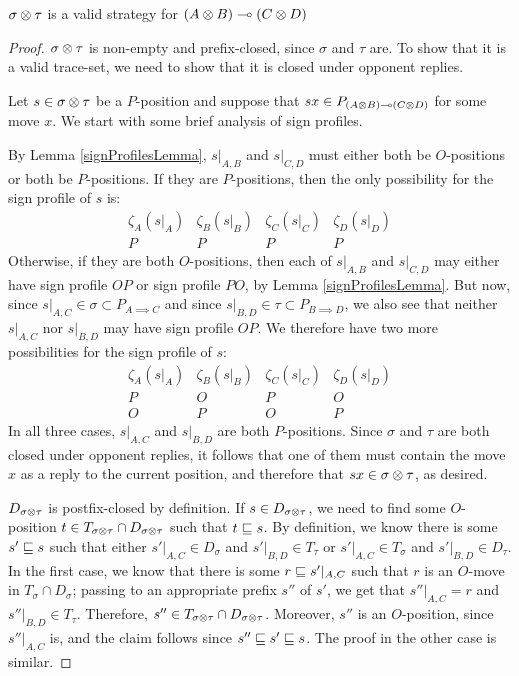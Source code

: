 \documentclass{article}
\begin{document}
\begin{proposition}
  $\sigma\otimes\tau$ is a valid strategy for $(A\otimes B)\multimap (C\otimes D)$
  \begin{proof}
    $\sigma\otimes\tau$ is non-empty and prefix-closed, since $\sigma$ and $\tau$ are.  To show that it is a valid trace-set, we need to show that it is closed under opponent replies.

    Let $s\in\sigma\otimes\tau$ be a $P$-position and suppose that $sx\in P_{(A\otimes B)\multimap (C\otimes D)}$ for some move $x$.  We start with some brief analysis of sign profiles.  

    By Lemma \ref{signProfilesLemma}, $s\vert_{A,B}$ and $s\vert_{C,D}$ must either both be $O$-positions or both be $P$-positions.  If they are $P$-positions, then the only possibility for the sign profile of $s$ is:
    \[
      \begin{array}{cccc}
        \zeta_A(s\vert_A) & \zeta_B(s\vert_B) & \zeta_C(s\vert_C) & \zeta_D(s\vert_D) \\
        \hline
        P & P & P & P
      \end{array}
      \]
    Otherwise, if they are both $O$-positions, then each of $s\vert_{A,B}$ and $s\vert_{C,D}$ may either have sign profile $OP$ or sign profile $PO$, by Lemma \ref{signProfilesLemma}.  But now, since $s\vert_{A,C}\in\sigma\subset P_{A\implies C}$ and since $s\vert_{B,D}\in\tau\subset P_{B\implies D}$, we also see that neither $s\vert_{A,C}$ nor $s\vert_{B,D}$ may have sign profile $OP$.  We therefore have two more possibilities for the sign profile of $s$:
    \[
      \begin{array}{cccc}
        \zeta_A(s\vert_A) & \zeta_B(s\vert_B) & \zeta_C(s\vert_C) & \zeta_D(s\vert_D) \\
        \hline
        P & O & P & O \\
        O & P & O & P
      \end{array}
      \]
    In all three cases, $s\vert_{A,C}$ and $s\vert_{B,D}$ are both $P$-positions.  Since $\sigma$ and $\tau$ are both closed under opponent replies, it follows that one of them must contain the move $x$ as a reply to the current position, and therefore that $sx\in\sigma\otimes\tau$, as desired.

    $D_{\sigma\otimes\tau}$ is postfix-closed by definition.  If $s\in D_{\sigma\otimes\tau}$, we need to find some $O$-position $t\in T_{\sigma\otimes\tau}\cap D_{\sigma\otimes\tau}$ such that $t\sqsubseteq s$.  By definition, we know there is some $s'\sqsubseteq s$ such that either $s'\vert_{A,C}\in D_\sigma$ and $s'\vert_{B,D}\in T_\tau$ or $s'\vert_{A,C}\in T_\sigma$ and $s'\vert_{B,D}\in D_\tau$.  In the first case, we know that there is some $r\sqsubseteq s'\vert_{A,C}$ such that $r$ is an $O$-move in $T_\sigma\cap D_\sigma$; passing to an appropriate prefix $s''$ of $s'$, we get that $s''\vert_{A,C}=r$ and $s''\vert_{B,D}\in T_\tau$.  Therefore, $s''\in T_{\sigma\otimes\tau}\cap D_{\sigma\otimes\tau}$.  Moreover, $s''$ is an $O$-position, since $s''\vert_{A,C}$ is, and the claim follows since $s''\sqsubseteq s'\sqsubseteq s$.  The proof in the other case is similar.


\end{proof}
\end{proposition}
\end{document}
